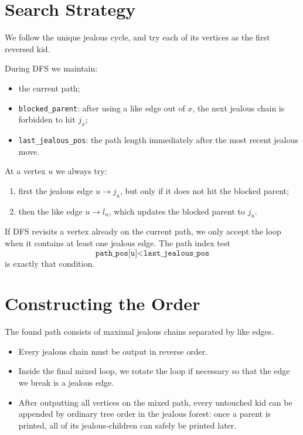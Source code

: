 \documentclass[11pt]{article}
\begin{document}
\section*{Search Strategy}

We follow the unique jealous cycle, and try each of its vertices as the first reversed kid.

During DFS we maintain:
\begin{itemize}[leftmargin=*]
    \item the current path;
    \item \texttt{blocked\_parent}: after using a like edge out of $x$, the next jealous chain is forbidden to hit $j_x$;
    \item \texttt{last\_jealous\_pos}: the path length immediately after the most recent jealous move.
\end{itemize}

At a vertex $u$ we always try:
\begin{enumerate}[leftmargin=*]
    \item first the jealous edge $u \to j_u$, but only if it does not hit the blocked parent;
    \item then the like edge $u \to l_u$, which updates the blocked parent to $j_u$.
\end{enumerate}

If DFS revisits a vertex already on the current path, we only accept the loop when it contains at least one jealous edge. The path index test
\[
\texttt{path\_pos[u]} < \texttt{last\_jealous\_pos}
\]
is exactly that condition.

\section*{Constructing the Order}

The found path consists of maximal jealous chains separated by like edges.

\begin{itemize}[leftmargin=*]
    \item Every jealous chain must be output in reverse order.
    \item Inside the final mixed loop, we rotate the loop if necessary so that the edge we break is a jealous edge.
    \item After outputting all vertices on the mixed path, every untouched kid can be appended by ordinary tree order in the jealous forest: once a parent is printed, all of its jealous-children can safely be printed later.
\end{itemize}
\end{document}
